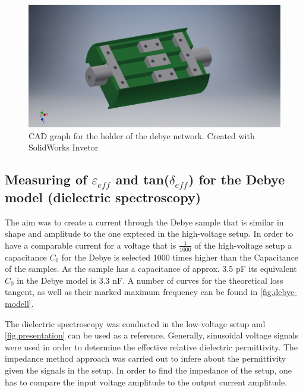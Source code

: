 \begin{figure}[h!tb]
\includegraphics[width=\textwidth]{figures/Method/CAD_MODEL/Gesamtanordnung.jpg}
\caption{CAD graph for the holder of the debye network. Created with SolidWorks Invetor}
\label{fig.CADgraph}
\end{figure}




    

\subsection{Measuring of $\varepsilon_{eff}$ and tan($\delta_{eff}$) for the Debye model (dielectric spectroscopy)}
\label{spectroscopy}
The aim was to create a current through the Debye sample that is similar in shape and amplitude to the one expteced in the high-voltage setup. In order to have a comparable current for a voltage that is $\frac{1}{1000}$ of the high-voltage setup a capacitance $C_0$ for the Debye is selected 1000 times higher than the Capacitance of the samples. As the sample has a capacitance of approx. 3.5 pF its equivalent $C_0$ in the Debye model is 3.3 nF.
A number of curves for the theoretical loss tangent, as well as their marked maximum frequency can be found in \ref{fig.debye-modell}.

The dielectric spectroscopy was conducted in the low-voltage setup and \ref{fig.presentation} can be used as a reference.
Generally, sinusoidal voltage signals were used in order to determine the effective relative dielectric permittivity.
The impedance method \cite{Kramer} approach was carried out to infere about the permittivity given the signals in the setup.
In order to find the impedance of the setup, one has to compare the input voltage amplitude to the output current amplitude.

